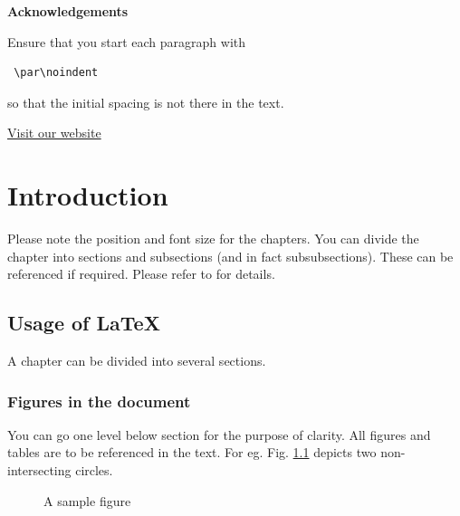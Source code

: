 \documentclass{book}
\begin{document}
	\newpage
	\centerline{\bf \Large Acknowledgements}
	\vspace*{0.5cm}
		\par\noindent Ensure that you start each paragraph with \begin{verbatim} \par\noindent \end{verbatim} so that the initial spacing is not there in the text.  %
		
		\href{https://www.example.com}{Visit our website} 
		\vfill

		\par{}

\tableofcontents
\listoffigures
\listoftables

\chapter{Introduction}
Please note the position and font size for the chapters. You can divide the chapter into sections and subsections (and in fact subsubsections). These can be referenced if required. Please refer to \cite{lamport86latex} for details. 

\section{Usage of \LaTeX}

A chapter can be divided into several sections. 


\subsection{Figures in the document}
You can go one level below section for the purpose of clarity. 
All figures and tables are to be referenced in the text. For eg. Fig. \ref{sample} depicts two non-intersecting circles. 


\begin{figure}[ht]
\epsfxsize=2.5in
\centerline{}
\caption{A sample figure}
\label{sample}
\end{figure}
\end{document}
